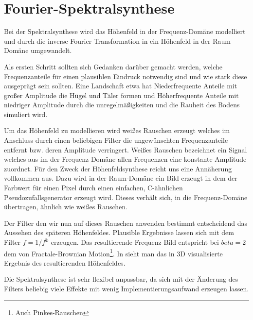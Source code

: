 \chapter{Fourier-Spektralsynthese}
Bei der Spektralsynthese wird das Höhenfeld in der Frequenz-Domäne modelliert und durch die inverse Fourier Transformation in ein Höhenfeld in der Raum-Domäne umgewandelt. 

Als ersten Schritt sollten sich Gedanken darüber gemacht werden, welche Frequenzanteile für einen plausiblen Eindruck notwendig sind und wie stark diese ausgeprägt sein sollten. Eine Landschaft etwa hat Niederfrequente Anteile mit großer Amplitude die Hügel und Täler formen und Höherfrequente Anteile mit niedriger Amplitude durch die unregelmäßigkeiten und die Rauheit des Bodens simuliert wird.

Um das Höhenfeld zu modellieren wird weißes Rauschen erzeugt welches im Anschluss durch einen beliebigen Filter die ungewünschten Frequenzanteile entfernt bzw. deren Amplitude verringert.
Weißes Rauschen bezeichnet ein Signal welches aus im der Frequenz-Domäne allen Frequenzen eine konstante Amplitude zuordnet. Für den Zweck der Höhenfeldsynthese reicht uns eine Annäherung vollkommen aus. Dazu wird in der Raum-Domäne ein Bild erzeugt in dem der Farbwert für einen Pixel durch einen einfachen, C-ähnlichen Pseudozufallsgenerator erzeugt wird. Dieses verhält sich, in die Frequenz-Domäne übertragen, ähnlich wie weißes Rauschen.

Der Filter den wir nun auf dieses Rauschen anwenden bestimmt entscheidend das Aussehen des späteren Höhenfeldes. Plausible Ergebnisse lassen sich mit dem Filter $f=1/f^\mathbb{b}$%
erzeugen. Das resultierende Frequenz Bild entspricht bei $beta=2$ dem von Fractale-Brownian Motion\footnote{Auch Pinkes-Rauschen}.
In %
sieht man das in 3D visualisierte Ergebnis des resultierenden Höhenfeldes.

Die Spektralsynthese ist sehr flexibel anpassbar, da sich mit der Änderung des Filters beliebig viele Effekte mit wenig Implementierungsaufwand erzeugen lassen.

